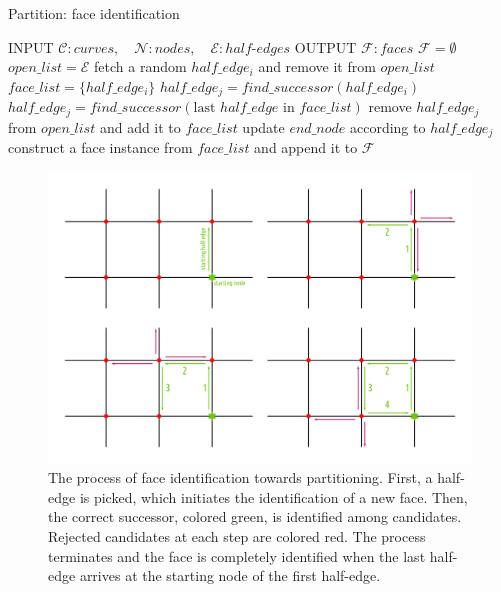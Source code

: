 \begin{algorithm}
  \caption {Partition: face identification}
  \label{alg:partitioning}
  \begin{algorithmic}
    \STATE INPUT  $\mathcal{C}:curves, \quad \mathcal{N}:nodes, \quad \mathcal{E}:half\text{-}edges$
    \STATE OUTPUT  $\mathcal{F}:faces$
    \STATE \quad
    \STATE $\mathcal{F} = \emptyset$
    \STATE $open\_list = \mathcal{E}$
    \STATE fetch a random $half\_edge_i$ and remove it from $open\_list$
    \STATE $face\_list = \{ half\_edge_i\}$
    \STATE $half\_edge_j= \mathit{find\_successor} \left( half\_edge_i \right)$
    \STATE $half\_edge_j= \mathit{find\_successor} \left( \text{last } half\_edge \text{ in } face\_list \right)$
    \STATE remove $half\_edge_j$ from $open\_list$ and add it to $face\_list$
    \STATE update $end\_node$ according to $half\_edge_j$
    \ENDWHILE
    \STATE construct a face instance from $face\_list$ and append it to $\mathcal{F}$
    \ENDWHILE
  \end{algorithmic}
\end{algorithm}

\begin{figure} %
    \centering
    \includegraphics[width=1.\textwidth]{figures/subd_pathFollower.png}
    \caption{The process of face identification towards partitioning.
      First, a half-edge is picked, which initiates the identification of a new face.
      Then, the correct successor, colored green, is identified among candidates.
      Rejected candidates at each step are colored red.
      The process terminates and the face is completely identified when the last half-edge arrives at the starting node of the first half-edge.}
    \label{fig:subd_pathFollower}
\end{figure}

